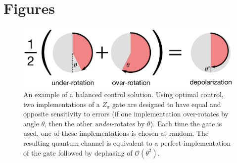 \documentclass[aps,nofootinbib,pra,notitlepage,twocolumn]{revtex4-1}
\newcommand{\order}[1]{\mathcal{O}\left( #1 \right)}
\begin{document}
\section{Figures}
\label{sec:figures}

\begin{figure}
  \centering
  \includegraphics[width=\columnwidth]{simple_example.pdf}
  \caption{An example of a balanced control solution. Using optimal control, two implementations of a $Z_\pi$ gate are designed to have equal and opposite sensitivity to errors (if one implementation over-rotates by angle $\theta$, then the other \emph{under}-rotates by $\theta$). Each time the gate is used, one of these implementations is chosen at random. The resulting quantum channel is equivalent to a perfect implementation of the gate followed by dephasing of $\order{\theta^2}$.}
  \label{fig:simple_example}
\end{figure}
\end{document}
